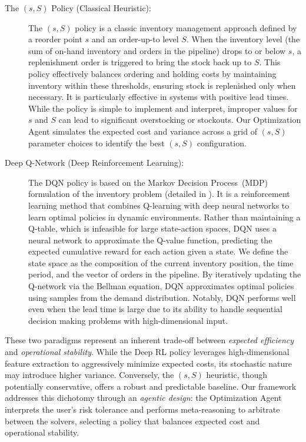 \documentclass[mnsc,nonblindrev]{informs3_hide}
\begin{document}
\begin{description}
    \item[The $(s, S)$ Policy (Classical Heuristic):] The $(s, S)$ policy is a classic inventory management approach defined by a reorder point $s$ and an order-up-to level $S$. When the inventory level (the sum of on-hand inventory and orders in the pipeline) drops to or below $s$, a replenishment order is triggered to bring the stock back up to $S$. This policy effectively balances ordering and holding costs by maintaining inventory within these thresholds, ensuring stock is replenished only when necessary. It is particularly effective in systems with positive lead times. While the policy is simple to implement and interpret, improper values for $s$ and $S$ can lead to significant overstocking or stockouts. Our Optimization Agent simulates the expected cost and variance across a grid of $(s, S)$ parameter choices to identify the best $(s, S)$ configuration.
    \item[Deep Q-Network (Deep Reinforcement Learning):] The DQN policy is based on the Markov Decision Process~(MDP) formulation of the inventory problem (detailed in ). It is a reinforcement learning method that combines Q-learning with deep neural networks to learn optimal policies in dynamic environments. Rather than maintaining a Q-table, which is infeasible for large state-action spaces, DQN uses a neural network to approximate the Q-value function, predicting the expected cumulative reward for each action given a state. We define the state space as the composition of the current inventory position, the time period, and the vector of orders in the pipeline. By iteratively updating the Q-network via the Bellman equation, DQN approximates optimal policies using samples from the demand distribution. Notably, DQN performs well even when the lead time is large due to its ability to handle sequential decision making problems with high-dimensional input.    
    \end{description}    
    These two paradigms represent an inherent trade-off between \textit{expected efficiency} and \textit{operational stability}. While the Deep RL policy leverages high-dimensional feature extraction to aggressively minimize expected costs, its stochastic nature may introduce higher variance. Conversely, the $(s, S)$ heuristic, though potentially conservative, offers a robust and predictable baseline.   
    Our framework addresses this dichotomy through an \textit{agentic design}: the Optimization Agent interprets the user's risk tolerance and performs meta-reasoning to arbitrate between the solvers, selecting a policy that balances expected cost and operational stability.
\end{document}
